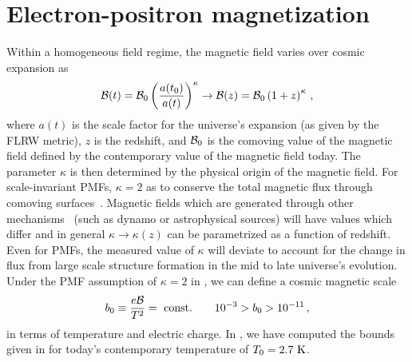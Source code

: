 \documentclass[a4paper]{article}
\begin{document}
\section{Electron-positron magnetization}\label{sec:electronPositron}
\noindent Within a homogeneous field regime, the magnetic field varies over cosmic expansion as
\begin{align}
    \label{cosmicscale}
    {\cal B}(t)={\cal B}_{0}\left(\frac{a(t_0)}{a(t)}\right)^{\kappa}\rightarrow{\cal B}(z)={\cal B}_{0}\left(1+z\right)^{\kappa}\,,
\end{align}
where $a(t)$ is the scale factor for the universe's expansion (as given by the FLRW metric), $z$ is the redshift, and ${\cal B}_{0}$ is the comoving value of the magnetic field defined by the contemporary value of the magnetic field today. The parameter $\kappa$ is then determined by the physical origin of the magnetic field. For scale-invariant PMFs, $\kappa=2$ as to conserve the total magnetic flux through comoving surfaces~\cite{durrer2013cosmological}. Magnetic fields which are generated through other mechanisms~\cite{pomakov2022redshift} (such as dynamo or astrophysical sources) will have values which differ and in general $\kappa\rightarrow\kappa(z)$ can be parametrized as a function of redshift. Even for PMFs, the measured value of $\kappa$ will deviate to account for the change in flux from large scale structure formation in the mid to late universe's evolution. Under the PMF assumption of $\kappa=2$ in , we can define a cosmic magnetic scale
\begin{align}
    \label{magneticscale}
    b_{0}\equiv\frac{e{\cal B}}{T^{2}}={\rm\ const.}\qquad10^{-3}>b_{0}>10^{-11}\,,
\end{align}
in terms of temperature and electric charge. In , we have computed the bounds given in  for today's contemporary temperature of $T_{0}=2.7{\rm\ K}$.
\end{document}

